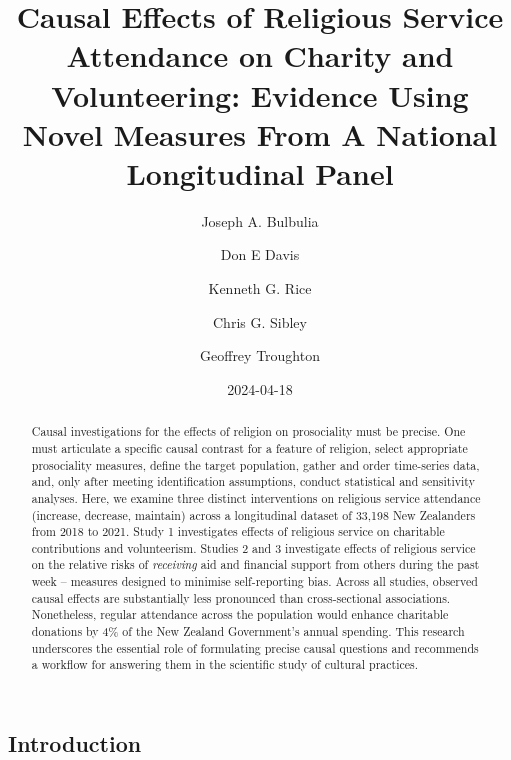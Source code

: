 \documentclass[
  single column]{article}
\title{Causal Effects of Religious Service Attendance on Charity and
Volunteering: Evidence Using Novel Measures From A National Longitudinal
Panel}
\author{Joseph A. Bulbulia \and Don E Davis \and Kenneth G.
Rice \and Chris G. Sibley \and Geoffrey Troughton}
\date{2024-04-18}
\begin{document}
\maketitle
\begin{abstract}
Causal investigations for the effects of religion on prosociality must
be precise. One must articulate a specific causal contrast for a feature
of religion, select appropriate prosociality measures, define the target
population, gather and order time-series data, and, only after meeting
identification assumptions, conduct statistical and sensitivity
analyses. Here, we examine three distinct interventions on religious
service attendance (increase, decrease, maintain) across a longitudinal
dataset of 33,198 New Zealanders from 2018 to 2021. Study 1 investigates
effects of religious service on charitable contributions and
volunteerism. Studies 2 and 3 investigate effects of religious service
on the relative risks of \emph{receiving} aid and financial support from
others during the past week -- measures designed to minimise
self-reporting bias. Across all studies, observed causal effects are
substantially less pronounced than cross-sectional associations.
Nonetheless, regular attendance across the population would enhance
charitable donations by 4\% of the New Zealand Government's annual
spending. This research underscores the essential role of formulating
precise causal questions and recommends a workflow for answering them in
the scientific study of cultural practices.
\end{abstract}

\subsection{Introduction}\label{introduction}
\end{document}
